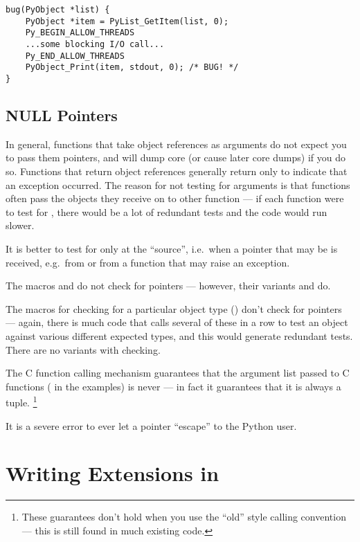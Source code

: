 \documentclass{manual}
\begin{document}
\begin{verbatim}
bug(PyObject *list) {
    PyObject *item = PyList_GetItem(list, 0);
    Py_BEGIN_ALLOW_THREADS
    ...some blocking I/O call...
    Py_END_ALLOW_THREADS
    PyObject_Print(item, stdout, 0); /* BUG! */
}
\end{verbatim}

\subsection{NULL Pointers
            \label{nullPointers}}

In general, functions that take object references as arguments do not
expect you to pass them \NULL{} pointers, and will dump core (or
cause later core dumps) if you do so.  Functions that return object
references generally return \NULL{} only to indicate that an
exception occurred.  The reason for not testing for \NULL{}
arguments is that functions often pass the objects they receive on to
other function --- if each function were to test for \NULL{},
there would be a lot of redundant tests and the code would run slower.

It is better to test for \NULL{} only at the ``source'', i.e.\ when a
pointer that may be \NULL{} is received, e.g.\ from
 or from a function that may raise an exception.

The macros  and 
do not check for \NULL{} pointers --- however, their variants
 and  do.

The macros for checking for a particular object type
() don't check for \NULL{} pointers ---
again, there is much code that calls several of these in a row to test
an object against various different expected types, and this would
generate redundant tests.  There are no variants with \NULL{}
checking.

The C function calling mechanism guarantees that the argument list
passed to C functions ( in the examples) is never
\NULL{} --- in fact it guarantees that it is always a tuple.%
\footnote{These guarantees don't hold when you use the ``old'' style
calling convention --- this is still found in much existing code.}

It is a severe error to ever let a \NULL{} pointer ``escape'' to
the Python user.  


\section{Writing Extensions in \Cpp{}
         \label{cplusplus}}
\end{document}
